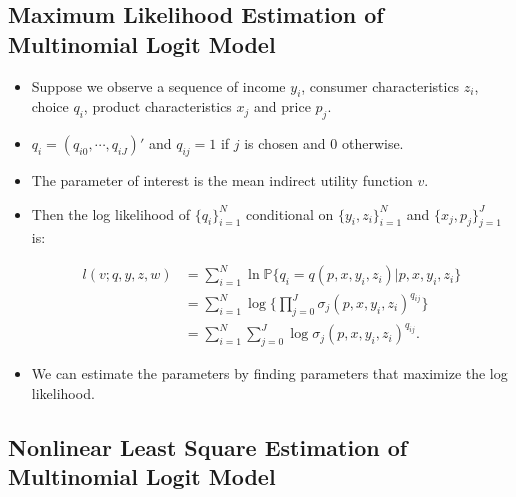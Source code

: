 \documentclass[]{book}
\providecommand{\tightlist}{%
  \setlength{\itemsep}{0pt}\setlength{\parskip}{0pt}}
\begin{document}
\subsection{Maximum Likelihood Estimation of Multinomial Logit
Model}\label{maximum-likelihood-estimation-of-multinomial-logit-model}

\begin{itemize}
\tightlist
\item
  Suppose we observe a sequence of income \(y_i\), consumer
  characteristics \(z_i\), choice \(q_{i}\), product characteristics
  \(x_j\) and price \(p_j\).
\item
  \(q_i = (q_{i0}, \cdots, q_{iJ})'\) and \(q_{ij} = 1\) if \(j\) is
  chosen and \(0\) otherwise.
\item
  The parameter of interest is the mean indirect utility function \(v\).
\item
  Then the log likelihood of \(\{q_i\}_{i = 1}^N\) conditional on
  \(\{y_i, z_i\}_{i = 1}^N\) and \(\{x_j,p_j\}_{j = 1}^J\) is:

  \begin{equation}
  \begin{split}
  l(v; q, y, z, w) &= \sum_{i = 1}^N \ln \mathbb{P}\{q_i = q(p, x, y_i, z_i)|p, x, y_i, z_i\}\\
  & = \sum_{i = 1}^N \log \Bigg\{ \prod_{j = 0}^{J} \sigma_{j}(p, x, y_i, z_i)^{q_{ij}} \Bigg\}\\
  &= \sum_{i = 1}^N \sum_{j = 0}^J \log \sigma_{j}(p, x, y_i, z_i)^{q_{ij}}.
  \end{split}
  \end{equation}
\item
  We can estimate the parameters by finding parameters that maximize the
  log likelihood.
\end{itemize}

\subsection{Nonlinear Least Square Estimation of Multinomial Logit
Model}\label{nonlinear-least-square-estimation-of-multinomial-logit-model}
\end{document}
